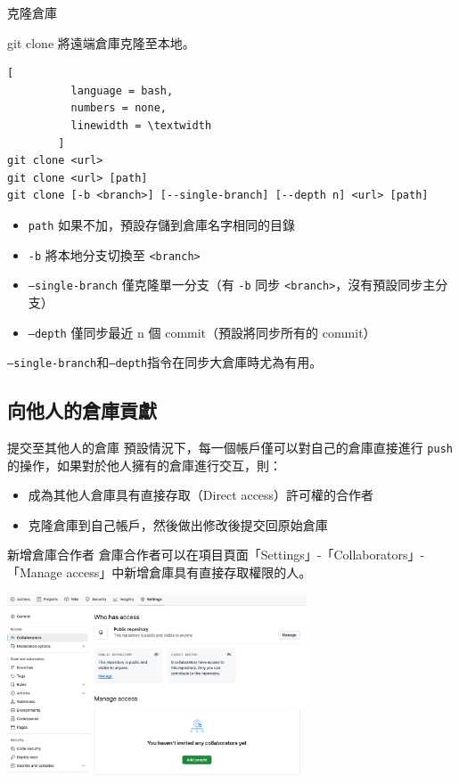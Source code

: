 \documentclass[xetex, unicode, 10pt, aspectratio=169]{beamer}
\begin{document}
\begin{frame}[fragile]{克隆倉庫}
    \begin{block}{git clone}
        將遠端倉庫克隆至本地。
        \begin{lstlisting}[
          language = bash,
          numbers = none,
          linewidth = \textwidth
        ]
git clone <url>
git clone <url> [path]
git clone [-b <branch>] [--single-branch] [--depth n] <url> [path]\end{lstlisting}
        \begin{itemize}
            \item \texttt{path} 如果不加，預設存儲到倉庫名字相同的目錄
            \item \texttt{-b} 將本地分支切換至 \texttt{<branch>}
            \item \texttt{--single-branch} 僅克隆單一分支（有 \texttt{-b} 同步
                \texttt{<branch>}，沒有預設同步主分支）
            \item \texttt{--depth} 僅同步最近 n 個 commit（預設將同步所有的 commit）
        \end{itemize}

        \texttt{--single-branch}和\texttt{--depth}指令在同步大倉庫時尤為有用。
    \end{block}
\end{frame}

\subsection{向他人的倉庫貢獻}

\begin{frame}{提交至其他人的倉庫}
    \justifying\hspace{17pt}預設情況下，每一個帳戶僅可以對自己的倉庫直接進行 \texttt{push}
    的操作，如果對於他人擁有的倉庫進行交互，則：
    \begin{itemize}
        \item 成為其他人倉庫具有直接存取（Direct access）許可權的合作者
        \item 克隆倉庫到自己帳戶，然後做出修改後提交回原始倉庫
    \end{itemize}
\end{frame}

\begin{frame}{新增倉庫合作者}
    倉庫合作者可以在項目頁面「Settings」-「Collaborators」-「Manage access」中新增倉庫具有直接存取權限的人。
    \begin{center}
        \includegraphics[width=3.5in]{./img/github-private-collaborators.png}
    \end{center}
\end{frame}
\end{document}
